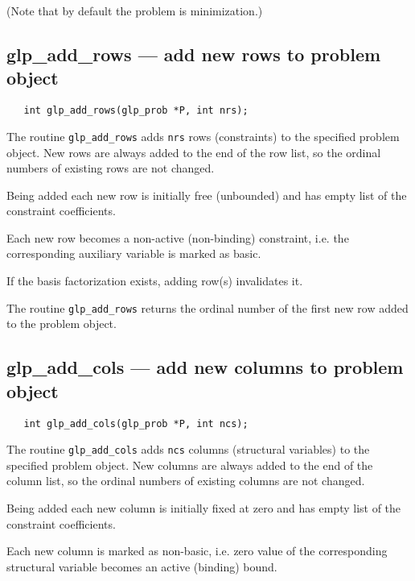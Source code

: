 \noindent
(Note that by default the problem is minimization.)

\subsection{glp\_add\_rows --- add new rows to problem object}

\synopsis

\begin{verbatim}
   int glp_add_rows(glp_prob *P, int nrs);
\end{verbatim}

\description

The routine \verb|glp_add_rows| adds \verb|nrs| rows (constraints) to
the specified problem object. New rows are always added to the end of
the row list, so the ordinal numbers of existing rows are not changed.

Being added each new row is initially free (unbounded) and has empty
list of the constraint coefficients.

Each new row becomes a non-active (non-binding) constraint, i.e. the
corresponding auxiliary variable is marked as basic.

If the basis factorization exists, adding row(s) invalidates it.

\returns

The routine \verb|glp_add_rows| returns the ordinal number of the first
new row added to the problem object.

\subsection{glp\_add\_cols --- add new columns to problem object}

\synopsis

\begin{verbatim}
   int glp_add_cols(glp_prob *P, int ncs);
\end{verbatim}

\description

The routine \verb|glp_add_cols| adds \verb|ncs| columns (structural
variables) to the specified problem object. New columns are always
added to the end of the column list, so the ordinal numbers of existing
columns are not changed.

Being added each new column is initially fixed at zero and has empty
list of the constraint coefficients.

Each new column is marked as non-basic, i.e. zero value of the
corresponding structural variable becomes an active (binding) bound.

